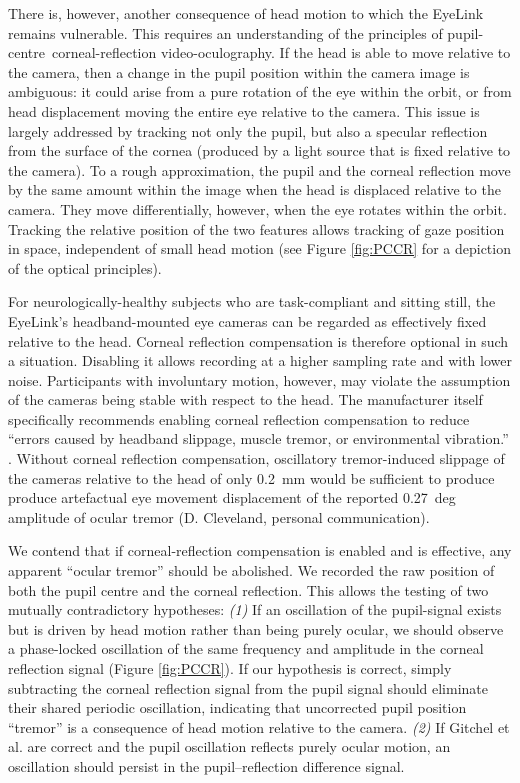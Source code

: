 \documentclass[jou,a4paper]{apa6}
\begin{document}
There is, however, another consequence of head motion to which the EyeLink remains vulnerable. This requires an understanding of the principles of pupil-centre~corneal-reflection video-oculography. If the head is able to move relative to the camera, then a change in the pupil position within the camera image is ambiguous: it could arise from a pure rotation of the eye within the orbit, or from head displacement moving the entire eye relative to the camera. This issue is largely addressed by tracking not only the pupil, but also a specular reflection from the surface of the cornea (produced by a light source that is fixed relative to the camera). To a rough approximation, the pupil and the corneal reflection move by the same amount within the image when the head is displaced relative to the camera. They move differentially, however, when the eye rotates within the orbit. Tracking the relative position of the two features allows tracking of gaze position in space, independent of small head motion (see Figure \ref{fig:PCCR} for a depiction of the optical principles).

For neurologically-healthy subjects who are task-compliant and sitting still, the EyeLink's headband-mounted eye cameras can be regarded as effectively fixed relative to the head. Corneal reflection compensation is therefore optional in such a situation. Disabling it allows recording at a higher sampling rate and with lower noise. Participants with involuntary motion, however, may violate the assumption of the cameras being stable with respect to the head. The manufacturer itself specifically recommends enabling corneal reflection compensation to reduce ``errors caused by headband slippage, muscle tremor, or environmental vibration.'' \citep{SR-Research-Ltd2002EyeLink-II-User}. Without corneal reflection compensation, oscillatory tremor-induced slippage of the cameras relative to the head of only 0.2~mm would be sufficient to produce produce artefactual eye movement displacement of the reported 0.27~deg amplitude of ocular tremor (D. Cleveland, personal communication).

We contend that if corneal-reflection compensation is enabled and is effective, any apparent ``ocular tremor'' should be abolished. We recorded the raw position of both the pupil centre and the corneal reflection. This allows the testing of two mutually contradictory hypotheses: \textit{(1)} If an oscillation of the pupil-signal exists but is driven by head motion rather than being purely ocular, we should observe a phase-locked oscillation of the same frequency and amplitude in the corneal reflection signal (Figure \ref{fig:PCCR}). If our hypothesis is correct, simply subtracting the corneal reflection signal from the pupil signal should eliminate their shared periodic oscillation, indicating that uncorrected pupil position ``tremor'' is a consequence of head motion relative to the camera. \textit{(2)} If Gitchel et al. are correct and the pupil oscillation reflects purely ocular motion, an oscillation should persist in the pupil--reflection difference signal.
\end{document}
